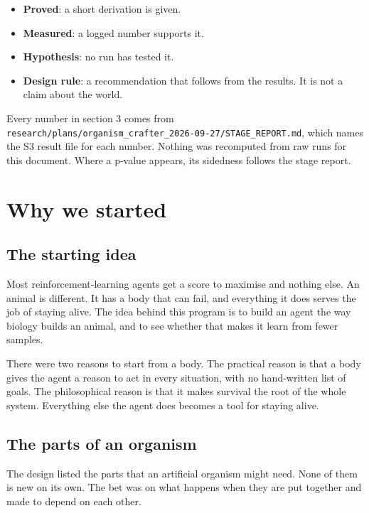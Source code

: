 \documentclass[11pt]{article}
\begin{document}
\begin{itemize}
\item \textbf{Proved}: a short derivation is given.
\item \textbf{Measured}: a logged number supports it.
\item \textbf{Hypothesis}: no run has tested it.
\item \textbf{Design rule}: a recommendation that follows from the results. It is not a claim about the world.
\end{itemize}

Every number in section 3 comes from \texttt{research/plans/organism\_crafter\_2026-09-27/STAGE\_REPORT.md}, which names the S3 result file for each number. Nothing was recomputed from raw runs for this document. Where a p-value appears, its sidedness follows the stage report.

\section{Why we started}

\subsection{The starting idea}

Most reinforcement-learning agents get a score to maximise and nothing else. An animal is different. It has a body that can fail, and everything it does serves the job of staying alive. The idea behind this program is to build an agent the way biology builds an animal, and to see whether that makes it learn from fewer samples.

There were two reasons to start from a body. The practical reason is that a body gives the agent a reason to act in every situation, with no hand-written list of goals. The philosophical reason is that it makes survival the root of the whole system. Everything else the agent does becomes a tool for staying alive.

\subsection{The parts of an organism}

The design listed the parts that an artificial organism might need. None of them is new on its own. The bet was on what happens when they are put together and made to depend on each other.
\end{document}
